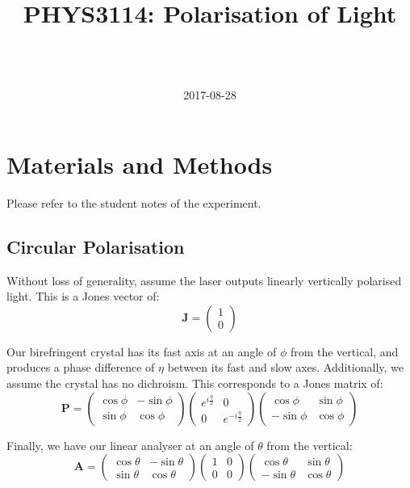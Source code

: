 \documentclass[a4paper]{scrartcl}
\begin{document}
\title{PHYS3114: Polarisation of Light}
\author{ \\ \\ }
\date{2017-08-28}
\maketitle

\section{Materials and Methods}
Please refer to the student notes of the experiment.

\subsection{Circular Polarisation}
Without loss of generality, assume the laser outputs linearly vertically polarised light. This is a Jones vector of:
\[\mathbf{J} = \begin{pmatrix}1 \\ 0\end{pmatrix}\]

Our birefringent crystal has its fast axis at an angle of \(\phi\) from the vertical, and produces a phase difference of \(\eta\) between its fast and slow axes. Additionally, we assume the crystal has no dichroism. This corresponds to a Jones matrix of:
\[\mathbf{P} = \begin{pmatrix}\cos \phi & -\sin \phi \\ \sin \phi & \cos \phi\end{pmatrix} \begin{pmatrix} e^{i \frac{\eta}{2}} & 0 \\ 0 & e^{-i \frac{\eta}{2}}\end{pmatrix} \begin{pmatrix}\cos \phi & \sin \phi \\ -\sin \phi & \cos \phi\end{pmatrix}\]

Finally, we have our linear analyser at an angle of \(\theta\) from the vertical:
\[\mathbf{A} = \begin{pmatrix}\cos \theta & -\sin \theta \\ \sin \theta & \cos \theta\end{pmatrix} \begin{pmatrix} 1 & 0 \\ 0 & 0\end{pmatrix} \begin{pmatrix}\cos \theta & \sin \theta \\ -\sin \theta & \cos \theta\end{pmatrix}\]
\end{document}
